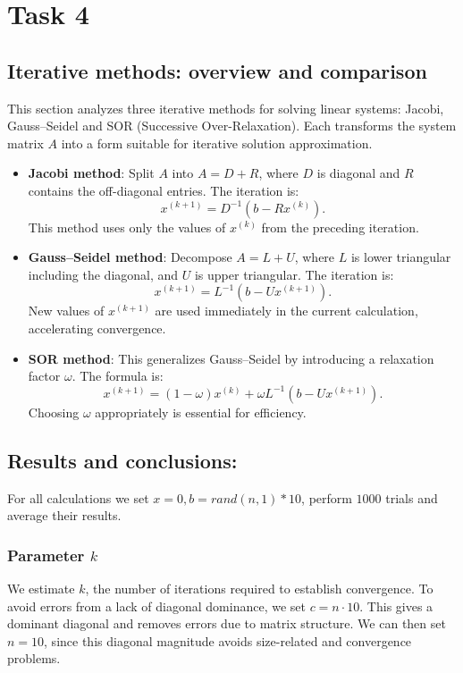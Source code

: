 \section{Task 4}

\subsection{Iterative methods: overview and comparison}
This section analyzes three iterative methods for solving linear systems: Jacobi, Gauss--Seidel and SOR (Successive Over-Relaxation). Each transforms the system matrix \( A \) into a form suitable for iterative solution approximation.
\begin{itemize}
    \item \textbf{Jacobi method}: Split \( A \) into \( A = D + R \), where \( D \) is diagonal and \( R \) contains the off-diagonal entries. The iteration is:
    \[
    x^{(k+1)} = D^{-1}(b - Rx^{(k)}).
    \]  
    This method uses only the values of \( x^{(k)} \) from the preceding iteration.

    \item \textbf{Gauss--Seidel method}: Decompose \( A = L + U \), where \( L \) is lower triangular including the diagonal, and \( U \) is upper triangular. The iteration is:
    \[
    x^{(k+1)} = L^{-1}(b - Ux^{(k+1)}).
    \]  
    New values of \( x^{(k+1)} \) are used immediately in the current calculation, accelerating convergence.

    \item \textbf{SOR method}: This generalizes Gauss--Seidel by introducing a relaxation factor \( \omega \). The formula is:
    \[
    x^{(k+1)} = (1-\omega)x^{(k)} + \omega L^{-1}(b - Ux^{(k+1)}).
    \]  
    Choosing \( \omega \) appropriately is essential for efficiency.
\end{itemize}


\subsection{Results and conclusions:} 
For all calculations we set $x=0, b=rand(n,1) *10$, perform $1000$ trials and average their results.\\
\subsubsection{Parameter $k$}
We estimate \( k \), the number of iterations required to establish convergence. To avoid errors from a lack of diagonal dominance, we set \( c = n \cdot 10 \). This gives a dominant diagonal and removes errors due to matrix structure. We can then set \( n = 10 \), since this diagonal magnitude avoids size-related and convergence problems.

